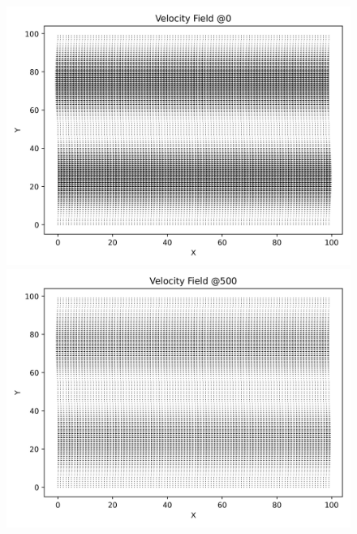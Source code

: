 \begin{figure}[h!]
    \begin{minipage}{0.33\textwidth}
        \includegraphics[width=\linewidth]{graphs/ShearWaveDecay/VelocityDistribution/velocity_field_0}
    \end{minipage}%
    \begin{minipage}{0.33\textwidth}
        \includegraphics[width=\linewidth]{graphs/ShearWaveDecay/VelocityDistribution/velocity_field_500}
    \end{minipage}%
    \begin{minipage}{0.33\textwidth}

\end{minipage}
\end{figure}
